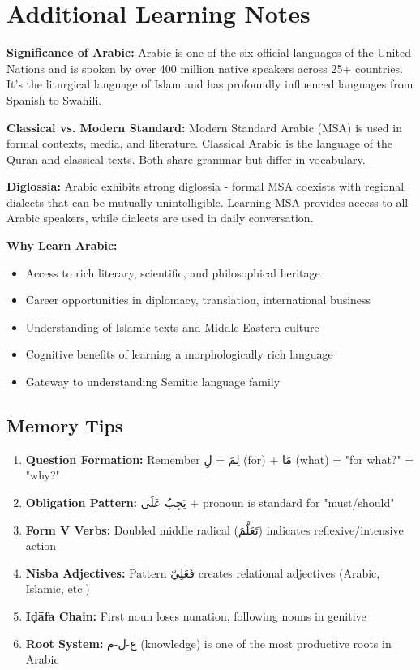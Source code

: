 \documentclass[letterpaper,12pt]{article}
\begin{document}
\section{Additional Learning Notes}

\begin{tcolorbox}[colback=boxcolor,colframe=accentcolor,title=\textbf{Cultural and Linguistic Context},breakable]
\textbf{Significance of Arabic:} Arabic is one of the six official languages of the United Nations and is spoken by over 400 million native speakers across 25+ countries. It's the liturgical language of Islam and has profoundly influenced languages from Spanish to Swahili.

\textbf{Classical vs. Modern Standard:} Modern Standard Arabic (MSA) is used in formal contexts, media, and literature. Classical Arabic is the language of the Quran and classical texts. Both share grammar but differ in vocabulary.

\textbf{Diglossia:} Arabic exhibits strong diglossia - formal MSA coexists with regional dialects that can be mutually unintelligible. Learning MSA provides access to all Arabic speakers, while dialects are used in daily conversation.

\textbf{Why Learn Arabic:}
\begin{itemize}
\item Access to rich literary, scientific, and philosophical heritage
\item Career opportunities in diplomacy, translation, international business
\item Understanding of Islamic texts and Middle Eastern culture
\item Cognitive benefits of learning a morphologically rich language
\item Gateway to understanding Semitic language family
\end{itemize}
\end{tcolorbox}

\subsection{Memory Tips}
\begin{enumerate}
\item \textbf{Question Formation:} Remember \textarabic{لِمَ} = \textarabic{لِ} (for) + \textarabic{مَا} (what) = "for what?" = "why?"
\item \textbf{Obligation Pattern:} \textarabic{يَجِبُ عَلَى} + pronoun is standard for "must/should"
\item \textbf{Form V Verbs:} Doubled middle radical (\textarabic{تَعَلَّمَ}) indicates reflexive/intensive action
\item \textbf{Nisba Adjectives:} Pattern \textarabic{فَعَلِيّ} creates relational adjectives (Arabic, Islamic, etc.)
\item \textbf{Iḍāfa Chain:} First noun loses nunation, following nouns in genitive
\item \textbf{Root System:} \textarabic{ع-ل-م} (knowledge) is one of the most productive roots in Arabic
\end{enumerate}
\end{document}
